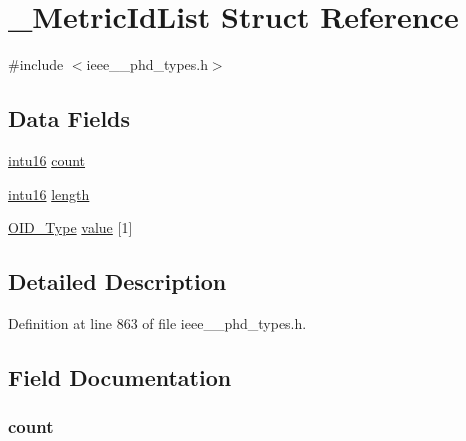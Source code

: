 \hypertarget{struct___metric_id_list}{}\section{\+\_\+\+Metric\+Id\+List Struct Reference}
\label{struct___metric_id_list}


{\ttfamily \#include $<$ieee\+\_\+\_\+phd\+\_\+types.\+h$>$}

\subsection*{Data Fields}
\begin{DoxyCompactItemize}
\item 
\hyperlink{ieee__11073__phd__types_8h_a3561595d2aa7416532e1c9910abd076d}{intu16} \hyperlink{struct___metric_id_list_abf6db060ae8e224764b0f867fb135ecd}{count}
\item 
\hyperlink{ieee__11073__phd__types_8h_a3561595d2aa7416532e1c9910abd076d}{intu16} \hyperlink{struct___metric_id_list_a3743679e4ff85e3e1b3fc2e59973fbb3}{length}
\item 
\hyperlink{ieee__11073__phd__types_8h_aa4d7af235d4a95d6632aa0d64160dd62}{O\+I\+D\+\_\+\+Type} \hyperlink{struct___metric_id_list_a33f73b3d426a499e63aae9644dd8813a}{value} \mbox{[}1\mbox{]}
\end{DoxyCompactItemize}


\subsection{Detailed Description}


Definition at line 863 of file ieee\+\_\+\_\+phd\+\_\+types.\+h.



\subsection{Field Documentation}
\hypertarget{struct___metric_id_list_abf6db060ae8e224764b0f867fb135ecd}{}
\subsubsection[{count}]{ count}\label{struct___metric_id_list_abf6db060ae8e224764b0f867fb135ecd}


